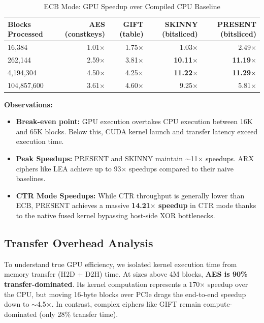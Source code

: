 \documentclass{article}
\begin{document}
\begin{table}[h!]
\centering
\caption{ECB Mode: GPU Speedup over Compiled CPU Baseline}
\begin{tabular}{@{}lrrrr@{}}
\toprule
\textbf{Blocks Processed} & \textbf{AES (constkeys)} & \textbf{GIFT (table)} & \textbf{SKINNY (bitsliced)} & \textbf{PRESENT (bitsliced)} \\ \midrule
16,384                    & 1.01$\times$             & 1.75$\times$          & 1.03$\times$                & 2.49$\times$                 \\
262,144                   & 2.59$\times$             & 3.81$\times$          & \textbf{10.11$\times$}      & \textbf{11.19$\times$}       \\
4,194,304                 & 4.50$\times$             & 4.25$\times$          & \textbf{11.22$\times$}      & \textbf{11.29$\times$}       \\
104,857,600               & 3.61$\times$             & 4.60$\times$          & 9.25$\times$                & 5.81$\times$                 \\ \bottomrule
\end{tabular}
\end{table}

\textbf{Observations:}
\begin{itemize}
    \item \textbf{Break-even point:} GPU execution overtakes CPU execution between 16K and 65K blocks. Below this, CUDA kernel launch and transfer latency exceed execution time.
    \item \textbf{Peak Speedups:} PRESENT and SKINNY maintain $\sim$11$\times$ speedups. ARX ciphers like LEA achieve up to 93$\times$ speedups compared to their naive baselines.
    \item \textbf{CTR Mode Speedups:} While CTR throughput is generally lower than ECB, PRESENT achieves a massive \textbf{14.21$\times$ speedup} in CTR mode thanks to the native fused kernel bypassing host-side XOR bottlenecks. 
\end{itemize}

\subsection{Transfer Overhead Analysis}
To understand true GPU efficiency, we isolated kernel execution time from memory transfer (H2D + D2H) time. At sizes above 4M blocks, \textbf{AES is 90\% transfer-dominated}. Its kernel computation represents a 170$\times$ speedup over the CPU, but moving 16-byte blocks over PCIe drags the end-to-end speedup down to $\sim$4.5$\times$. In contrast, complex ciphers like GIFT remain compute-dominated (only 28\% transfer time).
\end{document}

